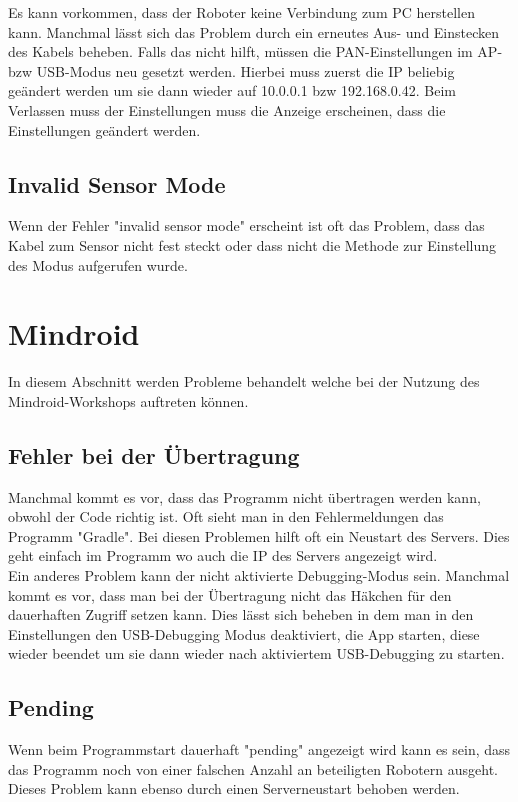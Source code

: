 \documentclass[
	ngerman,
	IMRAD=false,
	DIV=calc,
	paper=a4,
	marginpar=false,
	accentcolor=1c,%
	]{tudapub}
\begin{document}
Es kann vorkommen, dass der Roboter keine Verbindung zum PC herstellen kann. Manchmal lässt sich das Problem durch ein erneutes Aus- und Einstecken des Kabels beheben. \newline Falls das nicht hilft, müssen die PAN-Einstellungen im AP- bzw USB-Modus neu gesetzt werden. Hierbei muss zuerst die IP beliebig geändert werden um sie dann wieder auf 10.0.0.1 bzw 192.168.0.42. Beim Verlassen muss der Einstellungen muss die Anzeige erscheinen, dass die Einstellungen geändert werden.

\subsection{Invalid Sensor Mode}

Wenn der Fehler "invalid sensor mode" erscheint ist oft das Problem, dass das Kabel zum Sensor nicht fest steckt oder dass nicht die Methode zur Einstellung des Modus aufgerufen wurde.

\section{Mindroid}
In diesem Abschnitt werden Probleme behandelt welche bei der Nutzung des Mindroid-Workshops auftreten können.

\subsection{Fehler bei der Übertragung}

Manchmal kommt es vor, dass das Programm nicht übertragen werden kann, obwohl der Code richtig ist. Oft sieht man in den Fehlermeldungen das Programm "Gradle". Bei diesen Problemen hilft oft ein Neustart des Servers. Dies geht einfach im Programm wo auch die IP des Servers angezeigt wird.\\

Ein anderes Problem kann der nicht aktivierte Debugging-Modus sein. Manchmal kommt es vor, dass man bei der Übertragung nicht das Häkchen für den dauerhaften Zugriff setzen kann. Dies lässt sich beheben in dem man in den Einstellungen den USB-Debugging Modus deaktiviert, die App starten, diese wieder beendet um sie dann wieder nach aktiviertem USB-Debugging zu starten.

\subsection{Pending}
Wenn beim Programmstart dauerhaft "pending" angezeigt wird kann es sein, dass das Programm noch von einer falschen Anzahl an beteiligten Robotern ausgeht. Dieses Problem kann ebenso durch einen Serverneustart behoben werden.
\end{document}
